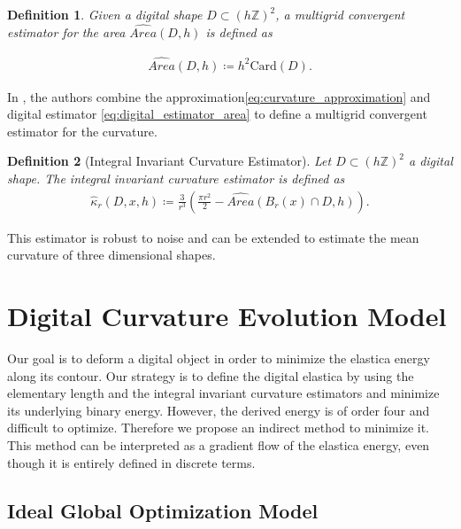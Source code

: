\documentclass[runningheads]{llncs}
\newtheorem{ddef}{Definition}
\begin{document}
\begin{ddef}	
  Given a digital shape $D \subset (h \mathbb{Z})^2$, a multigrid convergent estimator for the area $\widehat{Area}(D,h)$ is defined as	
		
  \begin{align}
    \widehat{Area}(D,h) \coloneqq h^2\text{Card}\left( D \right).	
    \label{eq:digital_estimator_area}
  \end{align}
\end{ddef}
	
In \cite{coeurjolly13}, the authors combine the approximation\eqref{eq:curvature_approximation} and digital estimator
\eqref{eq:digital_estimator_area} to define a multigrid convergent estimator for the curvature.

\begin{ddef}[Integral Invariant Curvature Estimator]
  Let $D \subset (h \mathbb{Z})^2$ a digital shape. The integral invariant curvature estimator is defined as
  \begin{align*}
    \hat{\kappa}_{r}(D,x,h) \coloneqq \frac{3}{r^3} \left( \frac{\pi r^2}{2} - \widehat{Area} \left( B_{r} ( x ) \cap D, h \right) \right).
  \end{align*}
\end{ddef}


This estimator is robust to noise and can be extended to estimate the mean curvature of three dimensional shapes.


\section{Digital Curvature Evolution Model}


Our goal is to deform a digital object in order to minimize the elastica energy along its contour. Our strategy is to
define the digital elastica by using the elementary length and the integral invariant curvature estimators and minimize
its underlying binary energy. However, the derived energy is of order four and difficult to optimize. Therefore we
propose an indirect method to minimize it. This method can be interpreted as a gradient flow of the elastica energy,
even though it is entirely defined in discrete terms.


\subsection{Ideal Global Optimization Model}
\end{document}
